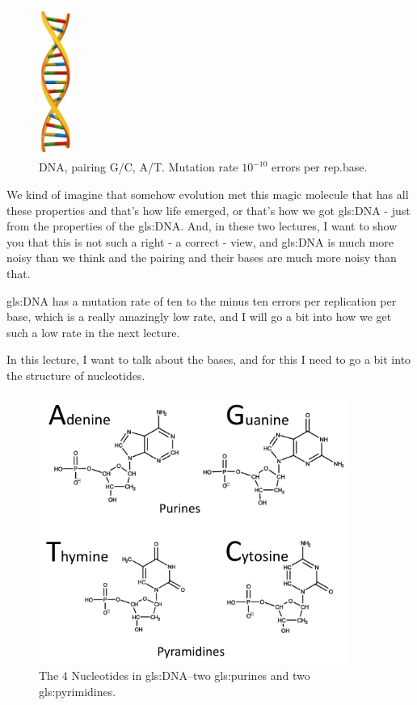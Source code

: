 \documentclass[]{article}
\begin{document}
\begin{figure}[H]
	\begin{center}
		\caption[DNA, pairing G/C, A/T.]{DNA, pairing G/C, A/T. Mutation rate $10^{-10}$ errors per rep.base. }\label{fig:DNA}
		\includegraphics[width=0.1\textwidth]{DNA}
	\end{center}
\end{figure}
We kind of imagine that
somehow evolution met this magic
molecule that has all these properties
and that's how life emerged,
or that's how we got \gls{gls:DNA} -
just from the properties of the \gls{gls:DNA}.
And, in these two lectures,
I want to show you
that this is not such a right -
a correct - view,
and \gls{gls:DNA} is much more noisy
than we think
and the pairing and their bases
are much more noisy than that.

\gls{gls:DNA} has a mutation rate
of ten to the minus ten errors
per replication per base,
which is a really amazingly low rate,
and I will go a bit into
how we get such a low rate
in the next lecture.

In this lecture, I want to talk about
the bases,
and for this I need to go a bit into
the structure of nucleotides.


\begin{figure}[H]
	\caption[The 4 Nucleotides in \gls{gls:DNA}]{The 4 Nucleotides in \gls{gls:DNA}--two \glspl{gls:purine} and two \glspl{gls:pyrimidine}.}\label{fig:Nucleotides} 
	\includegraphics[width=0.9\textwidth]{Nucleotides}
\end{figure}
\end{document}
